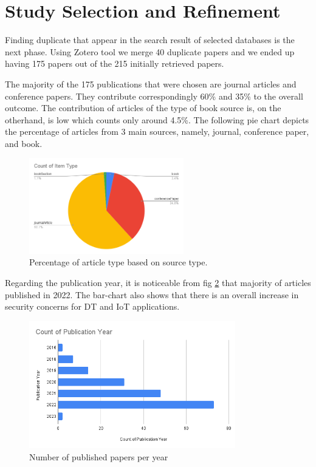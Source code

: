 \section{Study Selection and Refinement}
Finding duplicate that appear in the search result of selected databases is the next phase. Using Zotero tool we merge 40 duplicate papers and we ended up having 175 papers out of the 215 initially retrieved papers. 

The majority of the 175 publications that were chosen are journal articles and conference papers. They contribute correspondingly 60\% and 35\% to the overall outcome. The contribution of articles of the type of book source is, on the otherhand, is low which counts only around 4.5\%. The following pie chart depicts the percentage of articles from 3 main sources, namely, journal, conference paper, and book.  

\begin{figure}[ht]
    \centering
    \includegraphics[width=0.6\textwidth]{images/itemtype.png}
    \caption{Percentage of article type based on source type. }
    \label{fig:slr scheme}
\end{figure}

Regarding the publication year, it is noticeable from fig \ref{fig:bar-chart-yaer} that majority of articles published in 2022. The bar-chart also shows that there is an overall increase in security concerns for DT and IoT applications.

\begin{figure}[ht]
    \centering
    \includegraphics[width=0.8\textwidth]{images/year.png}
    \caption{Number of published papers per year}
    \label{fig:bar-chart-yaer}
\end{figure}


